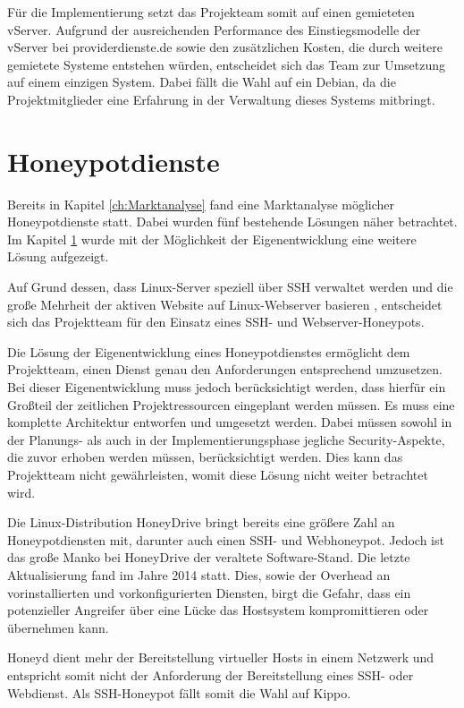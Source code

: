 Für die Implementierung setzt das Projekteam somit auf einen gemieteten vServer. Aufgrund der ausreichenden Performance des Einstiegsmodelle der vServer bei providerdienste.de sowie den zusätzlichen Kosten, die durch weitere gemietete Systeme entstehen würden, entscheidet sich das Team zur Umsetzung auf einem einzigen System. Dabei fällt die Wahl auf ein Debian, da die Projektmitglieder eine Erfahrung in der Verwaltung dieses Systems mitbringt.\\

\section{Honeypotdienste}
\label{sec:Honeypotdienste}

Bereits in Kapitel \ref{ch:Marktanalyse} fand eine Marktanalyse möglicher Honeypotdienste statt. Dabei wurden fünf bestehende Lösungen näher betrachtet. Im Kapitel \ref{sec:Honeypotdienste} wurde mit der Möglichkeit der Eigenentwicklung eine weitere Lösung aufgezeigt.

Auf Grund dessen, dass Linux-Server speziell über SSH verwaltet werden und die große Mehrheit der aktiven Website auf Linux-Webserver basieren \cite{w3techs16}, entscheidet sich das Projektteam für den Einsatz eines SSH- und Webserver-Honeypots.

Die Lösung der Eigenentwicklung eines Honeypotdienstes ermöglicht dem Projektteam, einen Dienst genau den Anforderungen entsprechend umzusetzen. Bei dieser Eigenentwicklung muss jedoch berücksichtigt werden, dass hierfür ein Großteil der zeitlichen Projektressourcen eingeplant werden müssen. Es muss eine komplette Architektur entworfen und umgesetzt werden. Dabei müssen sowohl in der Planungs- als auch in der Implementierungsphase jegliche Security-Aspekte, die zuvor erhoben werden müssen, berücksichtigt werden. Dies kann das Projektteam nicht gewährleisten, womit diese Lösung nicht weiter betrachtet wird.


Die Linux-Distribution HoneyDrive bringt bereits eine größere Zahl an Honeypotdiensten mit, darunter auch einen SSH- und Webhoneypot. Jedoch ist das große Manko bei HoneyDrive der veraltete Software-Stand. Die letzte Aktualisierung fand im Jahre 2014 statt. Dies, sowie der Overhead an vorinstallierten und vorkonfigurierten Diensten, birgt die Gefahr, dass ein potenzieller Angreifer über eine Lücke das Hostsystem kompromittieren oder übernehmen kann.

Honeyd dient mehr der Bereitstellung virtueller Hosts in einem Netzwerk und entspricht somit nicht der Anforderung der Bereitstellung eines SSH- oder Webdienst. Als SSH-Honeypot fällt somit die Wahl auf Kippo.

